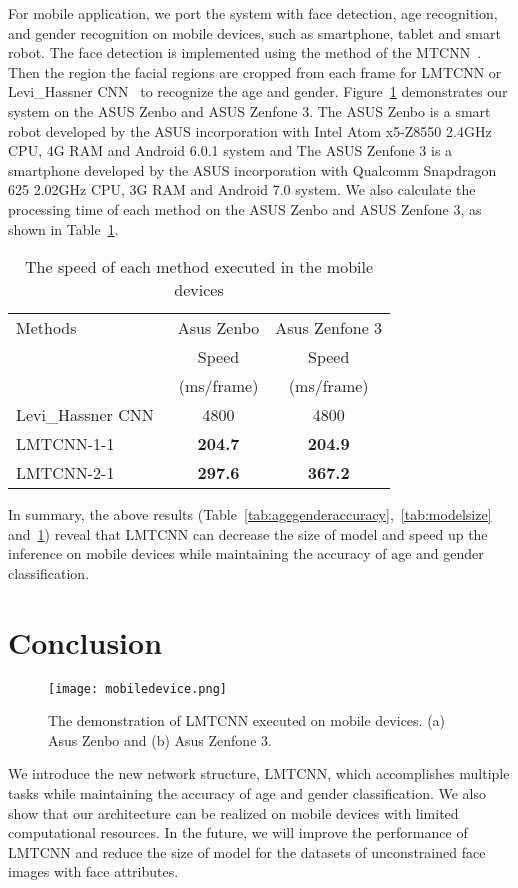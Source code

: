 \documentclass[times, 10pt,twocolumn]{article}
\begin{document}
For mobile application, we port the system with face detection, age recognition, and gender recognition on mobile devices, such as smartphone, tablet and smart robot. The face detection is implemented using the method of the MTCNN~\cite{zhang2016joint}. Then the region the facial regions are cropped from each frame for LMTCNN or Levi\_Hassner CNN~\cite{levi2015age} to recognize the age and gender. Figure~\ref{fig:mobiledevice} demonstrates our system on the ASUS Zenbo and ASUS Zenfone 3. The ASUS Zenbo is a smart robot developed by the ASUS incorporation with Intel Atom x5-Z8550 2.4GHz CPU, 4G RAM and Android 6.0.1 system and The ASUS Zenfone 3 is a smartphone developed by the ASUS incorporation with Qualcomm Snapdragon 625 2.02GHz CPU, 3G RAM and Android 7.0 system. We also calculate the processing time of each method on the ASUS Zenbo and ASUS Zenfone 3, as shown in Table~\ref{tab:mobilespeed}.

\begin{table}[]
\centering
\caption{The speed of each method executed in the mobile devices}
\label{tab:mobilespeed}
\begin{tabular}{@{}lcc@{}}
\toprule
Methods & Asus Zenbo & Asus Zenfone 3  \\
 & Speed & Speed \\
& (ms/frame) & (ms/frame) \\ \midrule
Levi\_Hassner CNN~\cite{levi2015age} &  4800 &  4800  \\
LMTCNN-1-1 & \textbf{ 204.7 } & \textbf{ 204.9 } \\
LMTCNN-2-1  & \textbf{ 297.6 } & \textbf{ 367.2 } \\\bottomrule
\end{tabular}
\end{table}




In summary, the above results (Table~\ref{tab:agegenderaccuracy},~\ref{tab:modelsize} and~\ref{tab:mobilespeed}) reveal that LMTCNN can decrease the size of model and speed up the inference on mobile devices while maintaining the accuracy of age and gender classification.

\section{Conclusion} \label{sec:conclusion}

\begin{figure}
\centering
\texttt{[image: mobiledevice.png]}
\caption{The demonstration of LMTCNN executed on mobile devices. (a) Asus Zenbo and (b) Asus Zenfone 3.}
\label{fig:mobiledevice}
\end{figure}

We introduce the new network structure, LMTCNN, which accomplishes multiple tasks while maintaining the accuracy of age and gender classification.
We also show that our architecture can be realized on mobile devices with limited computational resources.
In the future, we will improve the performance of LMTCNN and reduce the size of model for the datasets of unconstrained face images with face attributes.



\end{document}
